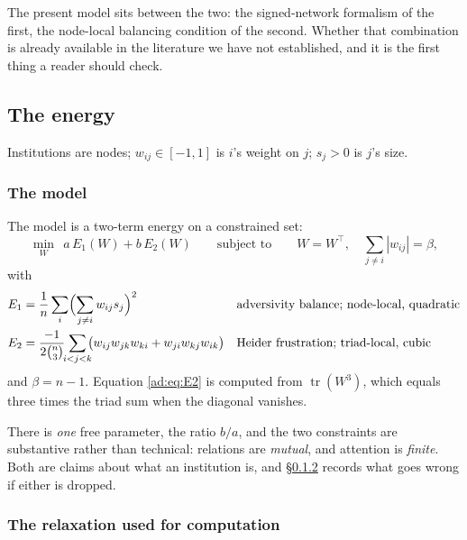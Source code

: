 \documentclass[11pt]{article}
\numberwithin{equation}{section}
\theoremstyle{plain}
\theoremstyle{definition}
\theoremstyle{remark}
\begin{document}
The present model sits between the two: the signed-network formalism of
the first, the node-local balancing condition of the second. Whether
that combination is already available in the literature we have not
established, and it is the first thing a reader should check.

\subsection{The energy}\label{ad:sub:energy}

Institutions are nodes; $w_{ij}\in[-1,1]$ is $i$'s weight on $j$;
$s_j>0$ is $j$'s size.

\subsubsection{The model}\label{ad:subsub:constrained}

The model is a two-term energy on a constrained set:
\begin{equation}\label{ad:eq:model}
\min_{W}\ \ a\,E_1(W)+b\,E_2(W)
\qquad\text{subject to}\qquad
W=W^{\!\top},\quad \sum_{j\ne i}|w_{ij}|=\beta ,
\end{equation}
with
\begin{align}
E_1&=\frac1n\sum_i\Bigl(\sum_{j\ne i}w_{ij}s_j\Bigr)^{2}
&&\text{adversivity balance; node-local, quadratic}\label{ad:eq:E1}\\
E_2&=\frac{-1}{2\binom n3}\!\!\sum_{i<j<k}\!\!
\bigl(w_{ij}w_{jk}w_{ki}+w_{ji}w_{kj}w_{ik}\bigr)
&&\text{Heider frustration; triad-local, cubic}\label{ad:eq:E2}
\end{align}
and $\beta=n-1$. Equation \eqref{ad:eq:E2} is computed from
$\operatorname{tr}(W^{3})$, which equals three times the triad sum when
the diagonal vanishes.

There is \emph{one} free parameter, the ratio $b/a$, and the two
constraints are substantive rather than technical: relations are
\emph{mutual}, and attention is \emph{finite}. Both are claims about
what an institution is, and \S\ref{ad:subsub:relaxation} records what
goes wrong if either is dropped.

\subsubsection{The relaxation used for computation}
\label{ad:subsub:relaxation}
\end{document}
